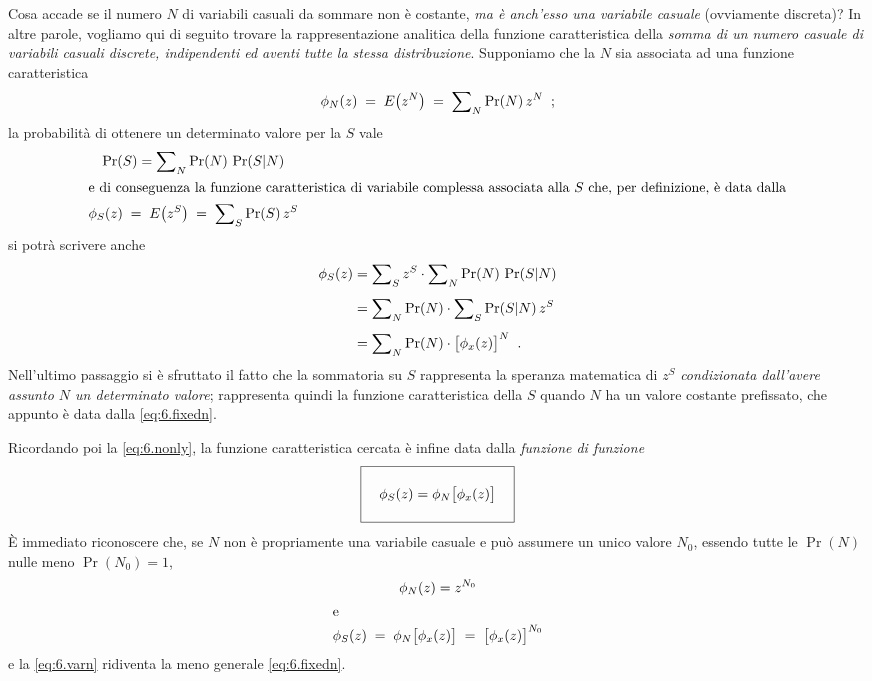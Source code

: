 %
Cosa accade se il numero $N$ di variabili casuali da sommare
non \`e costante, \emph{ma \`e anch'esso una variabile
  casuale} (ovviamente discreta)?  In altre parole, vogliamo
qui di seguito trovare la rappresentazione analitica della
funzione caratteristica della \emph{somma di un numero
  casuale di variabili casuali discrete, indipendenti ed
  aventi tutte la stessa distribuzione}.  Supponiamo che la
$N$ sia associata ad una funzione caratteristica
\begin{equation} \label{eq:6.nonly}
  \phi_N (z) \; = \; E \bigl( z^N \bigr) \; = \;
  \sum\nolimits_N \Pr (N) \, z^N \;\; ;
\end{equation}
la probabilit\`a di ottenere un determinato valore per la
$S$ vale
\begin{gather*}
  \Pr (S) = \sum\nolimits_N \Pr (N) \, \Pr (S | N) \\
  \intertext{e di conseguenza la funzione caratteristica
    di variabile complessa associata alla $S$ che, per
    definizione, \`e data dalla}
  \phi_S (z) \; = \; E \bigl( z^S \bigr) \; = \;
  \sum\nolimits_S \Pr (S) \, z^S
\end{gather*}
si potr\`a scrivere anche
\begin{align*}
  \phi_S (z) &= \sum\nolimits_S z^S \cdot \sum\nolimits_N
  \Pr (N) \, \Pr (S | N) \\[1ex]
  &= \sum\nolimits_N \Pr (N) \cdot \sum\nolimits_S \Pr
  (S | N) \, z^S \\[1ex]
  &= \sum\nolimits_N \Pr (N) \cdot \bigl[ \phi_x (z)
  \bigr]^N \;\; .
\end{align*}
Nell'ultimo passaggio si \`e sfruttato il fatto che la
sommatoria su $S$ rappresenta la speranza matematica di
$z^S$ \emph{condizionata dall'avere assunto $N$ un
  determinato valore}; rappresenta quindi la funzione
caratteristica della $S$ quando $N$ ha un valore costante
prefissato, che appunto \`e data dalla \eqref{eq:6.fixedn}.

Ricordando poi la \eqref{eq:6.nonly}, la funzione
caratteristica cercata \`e infine data dalla \emph{funzione
  di funzione}
\begin{equation} \label{eq:6.varn}
  \boxed{ \rule[-5mm]{0mm}{12mm} \quad
    \phi_S (z) = \phi_N \bigl[ \phi_x (z) \bigr] \quad }
 \end{equation}
 \`E immediato riconoscere che, se $N$ non \`e propriamente
 una variabile casuale e pu\`o assumere un unico valore
 $N_0$, essendo tutte le $\Pr(N)$ nulle meno $\Pr(N_0) = 1$,
\begin{gather*}
  \phi_N (z) = z^{N_0} \\
  \intertext{e}
  \phi_S (z) \; = \; \phi_N \bigl[ \phi_x (z) \bigr] \; =
  \; \bigl[ \phi_x (z) \bigr]^{N_0}
\end{gather*}
e la \eqref{eq:6.varn} ridiventa la meno generale
\eqref{eq:6.fixedn}.%
%

